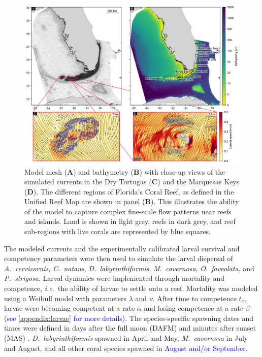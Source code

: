 \documentclass[preprint,12pt,authoryear]{elsarticle}
\newcommand{\modif}[1]{\textcolor{blue}{#1}}
\newcommand{\ie}{{\it i.e.}\ }
\begin{document}
	\begin{figure}
		\centering
		\includegraphics[width=\textwidth]{figures/fig_mesh_tnc.png}
		\caption{Model mesh (\textbf{A}) and bathymetry (\textbf{B}) with close-up views of the simulated currents in the Dry Tortugas (\textbf{C}) and the Marquesas Keys (\textbf{D}). The different regions of Florida's Coral Reef, as defined in the Unified Reef Map are shown in panel (\textbf{B}). This illustrates the ability of the model to capture complex fine-scale flow patterns near reefs and islands. Land is shown in light grey, reefs in dark grey, and reef sub-regions with live corals are represented by blue squares.}
		\label{fig:mesh}
	\end{figure}
	The modeled currents and the experimentally calibrated larval survival and competency parameters were then used to simulate the larval dispersal of \textit{A.~cervicornis}, \textit{C.~natans}, \textit{D.~labyrinthiformis}, \textit{M.~cavernosa}, \textit{O.~faveolata}, and \textit{P.~strigosa}.  Larval dynamics were implemented through mortality and competence, \ie the ability of larvae to settle onto a reef. Mortality was modeled using a Weibull model \citep{king2023larval} with parameters $\lambda$ and $\nu$. After time to competence $t_c$, larvae were becoming competent at a rate $\alpha$ and losing competence at a rate $\beta$ \modif{(see \ref{appendix:larvae} for more details)}. The species-specific spawning dates and times were defined in days after the full moon (DAFM) and minutes after sunset (MAS) \modif{\citep{vermeij2021coral}}. \textit{D.~labyrinthiformis} spawned in April and May, \textit{M.~cavernosa} in July and August, and all other coral species spawned in \modif{August and/or September}.
\end{document}
